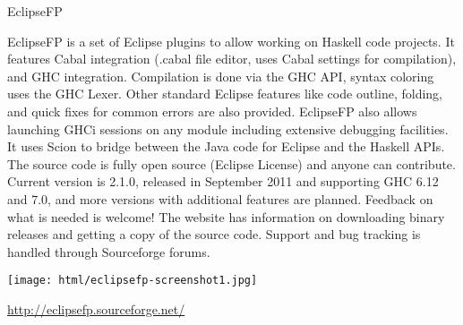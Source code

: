 \begin{hcarentry}{EclipseFP}
\makeheader

EclipseFP is a set of Eclipse plugins to allow working on Haskell code projects.
It features Cabal integration (.cabal file editor, uses Cabal settings for compilation), and GHC integration. Compilation is done via the GHC API, syntax coloring uses the GHC Lexer. Other standard Eclipse features like code outline, folding, and quick fixes for common errors are also provided. EclipseFP also allows launching GHCi sessions on any module including extensive debugging facilities. It uses Scion to bridge between the Java code for Eclipse and the Haskell APIs.
The source code is fully open source (Eclipse License) and anyone can contribute. Current version is 2.1.0, released in September 2011 and supporting GHC 6.12 and 7.0, and more versions with additional features are planned. Feedback on what is needed is welcome! The website has information on downloading binary releases and getting a copy of the source code. Support and bug tracking is handled through Sourceforge forums.

\begin{center}
\texttt{[image: html/eclipsefp-screenshot1.jpg]}
\end{center}

\FurtherReading 
\url{http://eclipsefp.sourceforge.net/}
\end{hcarentry}
